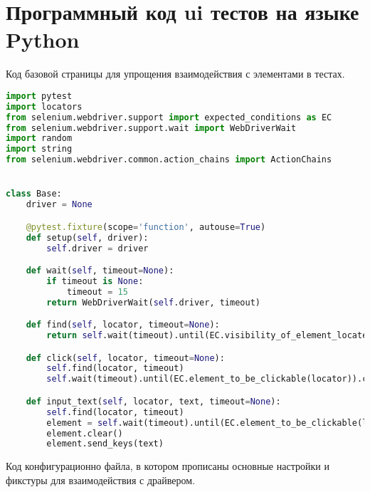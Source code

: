 \chapter{Программный код ui тестов на языке Python}\label{appendix-extra-examples}

Код базовой страницы для упрощения взаимодействия с элементами в тестах.

\begin{lstlisting}[language=Python]
import pytest
import locators
from selenium.webdriver.support import expected_conditions as EC
from selenium.webdriver.support.wait import WebDriverWait
import random
import string
from selenium.webdriver.common.action_chains import ActionChains


class Base:
    driver = None

    @pytest.fixture(scope='function', autouse=True)
    def setup(self, driver):
        self.driver = driver

    def wait(self, timeout=None):
        if timeout is None:
            timeout = 15
        return WebDriverWait(self.driver, timeout)

    def find(self, locator, timeout=None):
        return self.wait(timeout).until(EC.visibility_of_element_located(locator))

    def click(self, locator, timeout=None):
        self.find(locator, timeout)
        self.wait(timeout).until(EC.element_to_be_clickable(locator)).click()

    def input_text(self, locator, text, timeout=None):
        self.find(locator, timeout)
        element = self.wait(timeout).until(EC.element_to_be_clickable(locator))
        element.clear()
        element.send_keys(text)

\end{lstlisting}

Код конфигурационно файла, в котором прописаны основные настройки и фикстуры для взаимодействия с драйвером.

